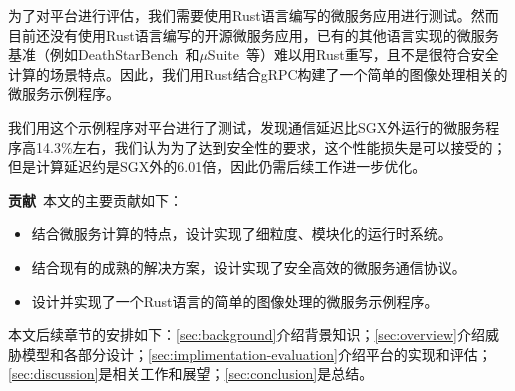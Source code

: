 为了对平台进行评估，我们需要使用Rust语言编写的微服务应用进行测试。然而目前还没有使用Rust语言编写的开源微服务应用，已有的其他语言实现的微服务基准（例如DeathStarBench~\cite{gan2019open}和$\mu$Suite~\cite{sriraman2018mu}等）难以用Rust重写，且不是很符合安全计算的场景特点。因此，我们用Rust结合gRPC构建了一个简单的图像处理相关的微服务示例程序。

我们用这个示例程序对平台进行了测试，发现通信延迟比SGX外运行的微服务程序高14.3\%左右，我们认为为了达到安全性的要求，这个性能损失是可以接受的；但是计算延迟约是SGX外的6.01倍，因此仍需后续工作进一步优化。

\textbf{贡献}\ 本文的主要贡献如下：
\begin{itemize}
    \item 结合微服务计算的特点，设计实现了细粒度、模块化的运行时系统。
    \item 结合现有的成熟的解决方案，设计实现了安全高效的微服务通信协议。
    \item 设计并实现了一个Rust语言的简单的图像处理的微服务示例程序。
\end{itemize}

本文后续章节的安排如下：\cref{sec:background}介绍背景知识；\cref{sec:overview}介绍威胁模型和各部分设计；\cref{sec:implimentation-evaluation}介绍平台的实现和评估；\cref{sec:discussion}是相关工作和展望；\cref{sec:conclusion}是总结。


